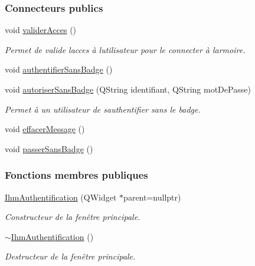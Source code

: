 \subsubsection*{Connecteurs publics}
\begin{DoxyCompactItemize}
\item 
void \hyperlink{class_ihm_authentification_ad62f646310fff597d3bf50af2c3d5d0c}{valider\+Acces} ()
\begin{DoxyCompactList}\small\item\em Permet de valide l\textquotesingle{}acces à l\textquotesingle{}utilisateur pour le connecter à l\textquotesingle{}armoire. \end{DoxyCompactList}\item 
void \hyperlink{class_ihm_authentification_af7427fc32a32954401a8792f5672ad19}{authentifier\+Sans\+Badge} ()
\item 
void \hyperlink{class_ihm_authentification_add8f8e7a0fbf70cef9399ba9f7db7b7e}{autoriser\+Sans\+Badge} (Q\+String identifiant, Q\+String mot\+De\+Passe)
\begin{DoxyCompactList}\small\item\em Permet à un utilisateur de s\textquotesingle{}authentifier sans le badge. \end{DoxyCompactList}\item 
void \hyperlink{class_ihm_authentification_a67dcacabc50a01245badd2d9268253a4}{effacer\+Message} ()
\item 
void \hyperlink{class_ihm_authentification_a6a67fe1c8e354a9ad123d8c53c16c6c4}{passer\+Sans\+Badge} ()
\end{DoxyCompactItemize}
\subsubsection*{Fonctions membres publiques}
\begin{DoxyCompactItemize}
\item 
\hyperlink{class_ihm_authentification_a09e60cbdf8d1377e17d940463acb75ba}{Ihm\+Authentification} (Q\+Widget $\ast$parent=nullptr)
\begin{DoxyCompactList}\small\item\em Constructeur de la fenêtre principale. \end{DoxyCompactList}\item 
\hyperlink{class_ihm_authentification_aa48bdda8dd131164c79ae4cc8b350320}{$\sim$\+Ihm\+Authentification} ()
\begin{DoxyCompactList}\small\item\em Destructeur de la fenêtre principale. \end{DoxyCompactList}\end{DoxyCompactItemize}
